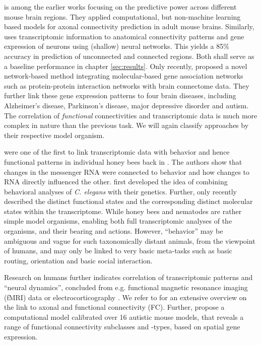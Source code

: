 \documentclass[]{article}
\renewcommand{\cite}{\citep}
\begin{document}
\citet{fakhry2015high} is among the earlier works focusing on the predictive power across different mouse brain regions. They applied computational, but non-machine learning based models for axonal connectivity prediction in adult mouse brains. Similarly, \citet{roberti2019exploiting} uses transcriptomic information to anatomical connectivity patterns and gene expression of neurons using (shallow) neural networks. This yields a 85\% accuracy in prediction of unconnected and connected regions. Both shall serve as a baseline performance in chapter \ref{sec:results}. 
Only recently, \citet{wang2022network} proposed a novel network-based method integrating molecular-based gene association networks such as protein-protein interaction networks with brain connectome data. They further link these gene expression patterns to four brain diseases, including Alzheimer’s disease, Parkinson’s disease, major depressive disorder and autism.\\

The correlation of \textit{functional} connectivities and transcriptomic data is much more complex in nature than the previous task. We will again classify approaches by their respective model organism.

\citet{whitfield2003gene} were one of the first to link transcriptomic data with behavior and hence functional patterns in individual honey bees back in \citeyear{whitfield2003gene}. The authors show that changes in the messenger RNA were connected to behavior and how changes to RNA directly influenced the other.
\citet{rankin2002gene} first developed the idea of combining behavioral analyses of \textit{C. elegans} with their genetics. Further, \citet{sun2021temporal} only recently described the distinct functional states and the corresponding distinct molecular states within the transcriptome. While honey bees and nematodes are rather simple model organisms, enabling both full transcriptomic analyses of the organisms, and their bearing and actions. However, ``behavior'' may be ambiguous and vague for such taxonomically distant animals, from the viewpoint of humans, and may only be linked to very basic meta-tasks such as basic routing, orientation and basic social interaction. 

Research on humans further indicates correlation of transcriptomic patterns and ``neural dynamics'', concluded from e.g. functional magnetic resonance imaging (fMRI) data \cite{richiardi2015correlated, diez2018neurogenetic, vertes2016gene} or electrocorticography \cite{betzel2019structural}. We refer to \citet{fulcher2021overcoming} for an extensive overview on the link to axonal and functional connectivity (FC). Further, \citet{Zerbi2021} propose a computational model calibrated over 16 autistic mouse models, that reveals a range of functional connectivity subclasses and -types, based on spatial gene expression.\\
\end{document}
